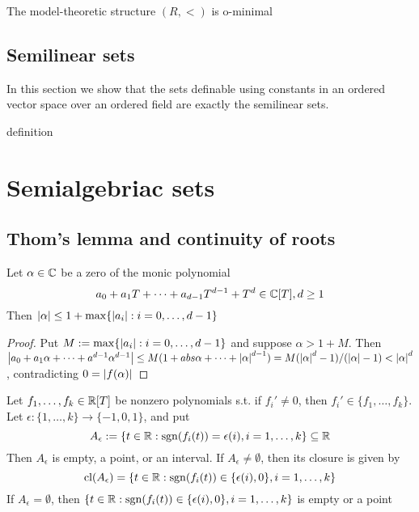 \documentclass[11pt]{article}
\begin{document}
\begin{corollary}[]
The model-theoretic structure \((R,<)\) is o-minimal
\end{corollary}
\subsection{Semilinear sets}
\label{sec:org4423948}
In this section we show that the sets definable using constants in an ordered vector space over
an ordered field are exactly the semilinear sets.

definition
\section{Semialgebriac sets}
\label{sec:orgc84d90e}
\subsection{Thom's lemma and continuity of roots}
\label{sec:orgf53ac04}
\begin{lemma}[]
Let \(\alpha\in\mathbb{C}\) be a zero of the monic polynomial
\begin{equation*}
a_0+a_1T+\dots+a_{d-1}T^{d-1}+T^d\in\mathbb{C}[T],d\ge 1
\end{equation*}
Then \(\abs{\alpha}\le 1+\max\{\abs{a_i}:i=0,\dots,d-1\}\)
\end{lemma}

\begin{proof}
Put \(M:=\max\{\abs{a_i}:i=0,\dots,d-1\}\) and suppose \(\alpha>1+M\). Then
\(\abs{a_0+a_1\alpha+\dots+a^{d-1}\alpha^{d-1}}\le M(1+abs{\alpha}+\dots+\abs{\alpha}^{d-1})=M(\abs{\alpha}^d-1)/(\abs{\alpha}-1)<\abs{\alpha}^d\),
contradicting \(0=\abs{f(\alpha)}\)
\end{proof}

\begin{lemma}[Thom]
Let \(f_1,\dots,f_k\in\mathbb{R}[T]\) be nonzero polynomials s.t. if \(f_i'\neq 0\), then \(f_i'\in\{f_1,\dots,f_k\}\).
Let \(\epsilon:\{1,\dots,k\}\to\{-1,0,1\}\), and put
\begin{equation*}
A_\epsilon:=\{t\in\mathbb{R}:\operatorname{sgn}(f_i(t))=\epsilon(i),i=1,\dots,k\}\subseteq\mathbb{R}
\end{equation*}
Then \(A_\epsilon\) is empty, a point, or an interval. If \(A_\epsilon\neq\emptyset\), then its closure is given by
\begin{equation*}
\operatorname{\text{cl}}(A_\epsilon)=\{t\in\mathbb{R}:\operatorname{sgn}(f_i(t))\in\{\epsilon(i),0\},i=1,\dots,k\}
\end{equation*}
If \(A_\epsilon=\emptyset\), then \(\{t\in\mathbb{R}:\operatorname{sgn}(f_i(t))\in\{\epsilon(i),0\},i=1,\dots,k\}\) is empty or a point
\end{lemma}
\end{document}

